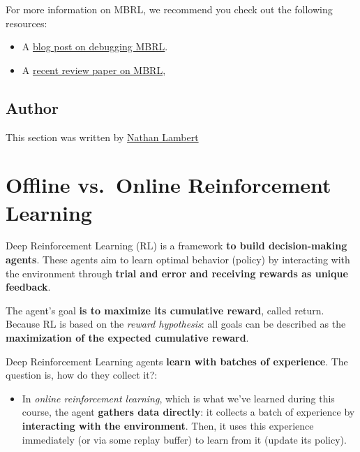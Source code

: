 \documentclass[11pt,a4paper]{article}
\begin{document}
For more information on MBRL, we recommend you check out the following resources:

\begin{itemize}
\item
  A \href{https://www.natolambert.com/writing/debugging-mbrl}{blog post on debugging MBRL}.
\item
  A \href{https://arxiv.org/abs/2006.16712}{recent review paper on MBRL},
\end{itemize}

\subsection{Author}\label{author-1}

This section was written by \href{https://twitter.com/natolambert}{Nathan Lambert}

\section{Offline vs.~Online Reinforcement Learning}\label{offline-vs.-online-reinforcement-learning}

Deep Reinforcement Learning (RL) is a framework \textbf{to build decision-making agents}. These agents aim to learn optimal behavior (policy) by interacting with the environment through \textbf{trial and error and receiving rewards as unique feedback}.

The agent's goal \textbf{is to maximize its cumulative reward}, called return. Because RL is based on the \emph{reward hypothesis}: all goals can be described as the \textbf{maximization of the expected cumulative reward}.

Deep Reinforcement Learning agents \textbf{learn with batches of experience}. The question is, how do they collect it?:


\begin{itemize}
\tightlist
\item
  In \emph{online reinforcement learning}, which is what we've learned during this course, the agent \textbf{gathers data directly}: it collects a batch of experience by \textbf{interacting with the environment}. Then, it uses this experience immediately (or via some replay buffer) to learn from it (update its policy).
\end{itemize}
\end{document}

